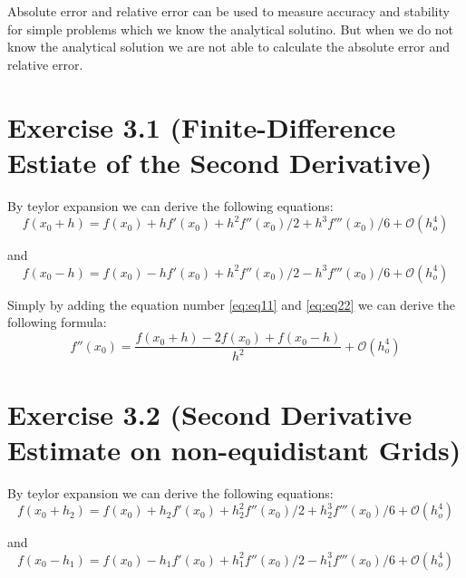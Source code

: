 \documentclass[10pt]{article}
\begin{document}
Absolute error and relative error can be used to measure accuracy and stability for simple problems which we know the analytical solutino. But when we do not know the analytical solution we are not able to calculate the absolute error and relative error.\\

\section{Exercise 3.1 (Finite-Difference Estiate of the Second Derivative)}

By teylor expansion we can derive the following equations:\\

\begin{equation}\label{eq:eq11}
 f(x_0+h) = f(x_0) + hf'(x_0) + h^2f''(x_0)/2 + h^3f'''(x_0)/6 + \mathcal{O}(h^4_o)  
\end{equation}

and\\

\begin{equation}\label{eq:eq22}
 f(x_0-h) = f(x_0) - hf'(x_0) + h^2f''(x_0)/2 - h^3f'''(x_0)/6 + \mathcal{O}(h^4_o)  
\end{equation}

Simply by adding the equation number \ref{eq:eq11} and \ref{eq:eq22} we can derive the following formula:\\


\begin{equation}
f''(x_0) = \frac{f(x_0+h) - 2f(x_0) + f(x_0-h)}{ h^2}  + \mathcal{O}(h^4_o)  
\end{equation}




\section{Exercise 3.2 (Second Derivative Estimate on non-equidistant Grids)}

By teylor expansion we can derive the following equations:\\

\begin{equation}\label{eq:eq1}
 f(x_0+h_2) = f(x_0) + h_2f'(x_0) + h_2^2f''(x_0)/2 + h_2^3f'''(x_0)/6 + \mathcal{O}(h^4_o)  
\end{equation}

and\\

\begin{equation}\label{eq:eq2}
 f(x_0-h_1) = f(x_0) - h_1f'(x_0) + h_1^2f''(x_0)/2 - h_1^3f'''(x_0)/6 + \mathcal{O}(h^4_o)  
\end{equation}
\end{document}
